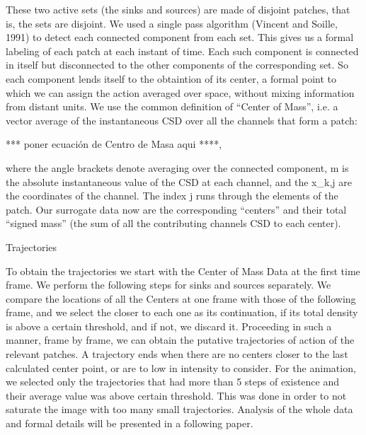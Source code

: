 These two active sets (the sinks and sources) are made of disjoint patches, that
is, the sets are disjoint. We used a single pass algorithm
(Vincent and Soille, 1991) to detect each connected component from each set. This gives
us a formal labeling of each patch at each instant of time. Each such component is
connected in itself but disconnected to the other components of the corresponding set.
So each component lends itself to the obtaintion of its center,
a formal point to which we can
assign the action averaged over space, without mixing information from
distant units. We use the common definition of ``Center of Mass'', i.e. a
vector average of the instantaneous CSD over all the channels that
form a patch:

*** poner ecuación de Centro de Masa aqui ****,

where the angle brackets denote averaging over the connected component, m
is the absolute instantaneous value of the CSD at each channel, and the x_{k,j} are the coordinates
of the channel. The index j runs through the elements of the patch.
Our surrogate data now are the corresponding ``centers'' and
their total ``signed mass''
(the sum of all the contributing channels CSD to each center).



Trajectories

To obtain the trajectories we start with the Center of Mass Data at
the first  time frame. We perform the following
steps for sinks and sources separately. We  compare the locations of all
the Centers at one frame with those of the following frame, and we select the closer to
each one as its continuation, if its total density is above a certain
threshold, and if not, we discard it. Proceeding in such a manner, frame
by frame, we can obtain the putative trajectories of action of the
relevant patches. A trajectory ends when there are no centers closer
to the last calculated center point, or are to low in intensity to consider.
For the animation, we selected only the trajectories that had more
than 5 steps of existence and their average value was above certain
threshold. This was done in order to not saturate the image with too
many small trajectories. Analysis of the whole data and formal details
will be presented in a following paper.



